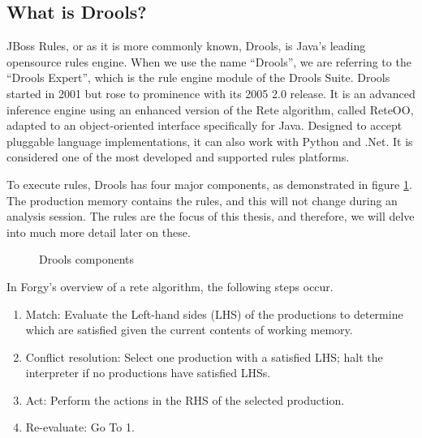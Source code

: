\subsection{What is Drools?}\label{section:WhatIsDrools}

JBoss Rules, or as it is more commonly known, Drools, is Java's leading opensource rules engine.
When we use the name ``Drools'', we are referring to the ``Drools Expert'', which is the rule engine module of the Drools Suite.
Drools started in 2001 but rose to prominence with its 2005 2.0 release.
It is an advanced inference engine using an enhanced version of the Rete algorithm, called Rete\-OO\cite{sottara2010configurable}, adapted to an object-oriented interface specifically for Java.
Designed to accept pluggable language implementations, it can also work with Python and .Net.
It is considered one of the most developed and supported rules platforms.

To execute rules, Drools has four major components, as demonstrated in figure \ref{fig:Drools_components}.
The production memory contains the rules, and this will not change during an analysis session.
The rules are the focus of this thesis, and therefore, we will delve into much more detail later on these.

\begin{figure}
    \centering
    \caption{Drools components}
    \label{fig:Drools_components}
\end{figure}

In Forgy's\cite{forgy1989rete} overview of a rete algorithm, the following steps occur.
\begin{enumerate}
    \setlength\itemsep{0em}
    \item Match: Evaluate the Left-hand sides (LHS) of the productions to determine which are satisfied given the current contents of working memory.
    \item Conflict resolution: Select one production with a satisfied LHS; halt the interpreter if no productions have satisfied LHSs.
    \item Act: Perform the actions in the RHS of the selected production.
    \item Re-evaluate: Go To 1.
\end{enumerate}

